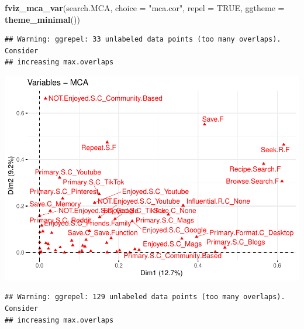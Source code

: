 \documentclass[
]{article}
\newenvironment{Shaded}{\begin{snugshade}}{\end{snugshade}}
\newcommand{\DataTypeTok}[1]{\textcolor[rgb]{0.13,0.29,0.53}{#1}}
\newcommand{\KeywordTok}[1]{\textcolor[rgb]{0.13,0.29,0.53}{\textbf{#1}}}
\newcommand{\NormalTok}[1]{#1}
\newcommand{\OtherTok}[1]{\textcolor[rgb]{0.56,0.35,0.01}{#1}}
\newcommand{\StringTok}[1]{\textcolor[rgb]{0.31,0.60,0.02}{#1}}
\begin{document}
\begin{Shaded}
\begin{Highlighting}[]
\KeywordTok{fviz_mca_var}\NormalTok{(search.MCA, }\DataTypeTok{choice =} \StringTok{"mca.cor"}\NormalTok{, }\DataTypeTok{repel =} \OtherTok{TRUE}\NormalTok{,}
             \DataTypeTok{ggtheme =} \KeywordTok{theme_minimal}\NormalTok{())}
\end{Highlighting}
\end{Shaded}

\begin{verbatim}
## Warning: ggrepel: 33 unlabeled data points (too many overlaps). Consider
## increasing max.overlaps
\end{verbatim}

\includegraphics{Average-User-MCA_files/figure-latex/diet yes search-2.pdf}

\begin{Shaded}
\end{Shaded}

\begin{verbatim}
## Warning: ggrepel: 129 unlabeled data points (too many overlaps). Consider
## increasing max.overlaps
\end{verbatim}
\end{document}
